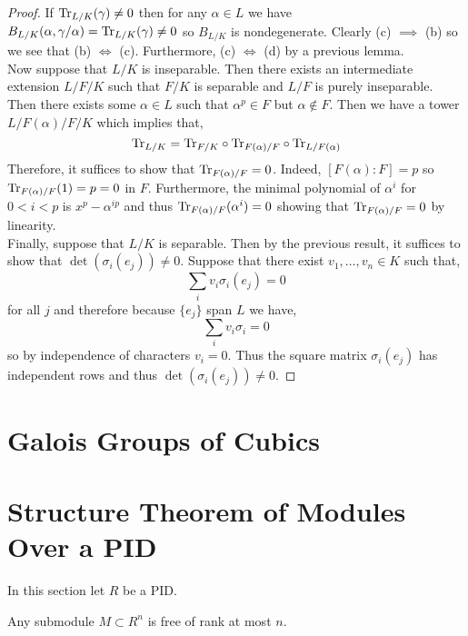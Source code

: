 \documentclass[12pt]{article}
\begin{document}
\begin{proof}
If $\mathrm{Tr}_{L/K}(\gamma) \neq 0$ then for any $\alpha \in L$ we have $B_{L/K}(\alpha, \gamma/\alpha) = \mathrm{Tr}_{L/K}(\gamma) \neq 0$ so $B_{L/K}$ is nondegenerate. Clearly (c) $\implies$ (b) so we see that (b) $\iff$ (c). Furthermore, (c) $\iff$ (d) by a previous lemma.
\bigskip\\
Now suppose that $L/K$ is inseparable. Then there exists an intermediate extension $L/F/K$ such that $F/K$ is separable and $L/F$ is purely inseparable. Then there exists some $\alpha \in L$ such that $\alpha^p \in F$ but $\alpha \notin F$. Then we have a tower $L / F(\alpha)/F/K$ which implies that,
\[ \mathrm{Tr}_{L/K} = \mathrm{Tr}_{F/K} \circ \mathrm{Tr}_{F(\alpha)/F} \circ \mathrm{Tr}_{L/F(\alpha)} \]
Therefore, it suffices to show that $\mathrm{Tr}_{F(\alpha)/F} = 0$. Indeed, $[F(\alpha) : F] = p$ so $\mathrm{Tr}_{F(\alpha)/F}(1) = p = 0$ in $F$. Furthermore, the minimal polynomial of $\alpha^i$ for $0 < i < p$ is $x^p - \alpha^{ip}$ and thus $\mathrm{Tr}_{F(\alpha)/F}(\alpha^i) = 0$ showing that $\mathrm{Tr}_{F(\alpha)/F} = 0$ by linearity.
\bigskip\\
Finally, suppose that $L/K$ is separable. Then by the previous result, it suffices to show that $\det{(\sigma_i(e_j))} \neq 0$. Suppose that there exist $v_1, \dots, v_n \in K$ such that,
\[ \sum_i v_i \sigma_i(e_j) = 0 \]
for all $j$ and therefore because $\{ e_j \}$ span $L$ we have,
\[ \sum_i v_i \sigma_i = 0 \]
so by independence of characters $v_i = 0$. Thus the square matrix $\sigma_i(e_j)$ has independent rows and thus $\det{(\sigma_i(e_j))} \neq 0$.
\end{proof}


\section{Galois Groups of Cubics}


\section{Structure Theorem of Modules Over a PID}

\begin{rmk}
In this section let $R$ be a PID.
\end{rmk}

\begin{prop}
Any submodule $M \subset R^n$ is free of rank at most $n$.
\end{prop}
\end{document}
